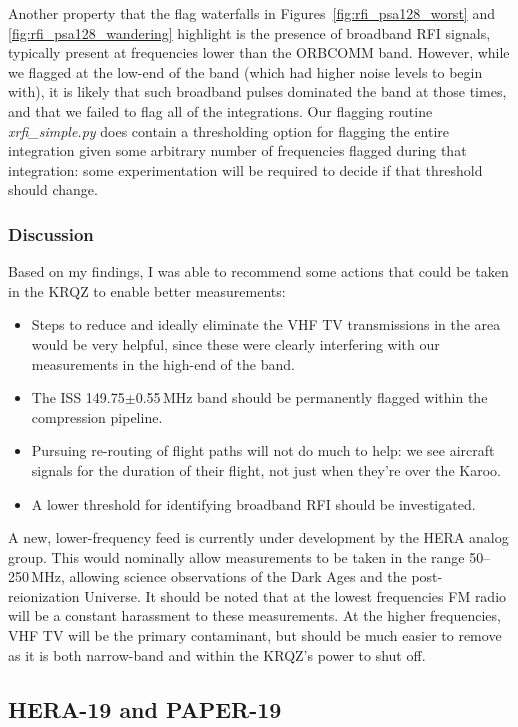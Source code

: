 Another property that the flag waterfalls in Figures~\ref{fig:rfi_psa128_worst} and \ref{fig:rfi_psa128_wandering} highlight is the presence of broadband RFI signals, typically present at frequencies lower than the ORBCOMM band. However, while we flagged at the low-end of the band (which had higher noise levels to begin with), it is likely that such broadband pulses dominated the band at those times, and that we failed to flag all of the integrations. Our flagging routine \textit{xrfi\_simple.py} does contain a thresholding option for flagging the entire integration given some arbitrary number of frequencies flagged during that integration: some experimentation will be required to decide if that threshold should change.

\subsubsection{Discussion}
\label{subsubsec:rfi_paper128_conc}

Based on my findings, I was able to recommend some actions that could be taken in the KRQZ to enable better measurements:
\begin{itemize}
\item  Steps to reduce and ideally eliminate the VHF TV transmissions in the area would be very helpful, since these were clearly interfering with our measurements in the high-end of the band.
\item The ISS 149.75$\pm$0.55\,MHz band should be permanently flagged within the compression pipeline.
\item Pursuing re-routing of flight paths will not do much to help: we see aircraft signals for the duration of their flight, not just when they're over the Karoo.
\item A lower threshold for identifying broadband RFI should be investigated.
\end{itemize}

A new, lower-frequency feed is currently under development by the HERA analog group. This would nominally allow measurements to be taken in the range 50--250\,MHz, allowing science observations of the Dark Ages and the post-reionization Universe. It should be noted that at the lowest frequencies FM radio will be a constant harassment to these measurements. At the higher frequencies, VHF TV will be the primary contaminant, but should be much easier to remove as it is both narrow-band and within the KRQZ's power to shut off.

\subsection{HERA-19 and PAPER-19}
\label{subsec:rfi_hera19paper19}

